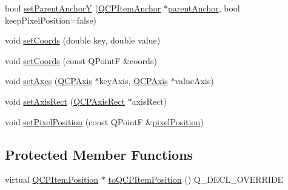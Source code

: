 \begin{DoxyCompactItemize}
\item 
bool \hyperlink{classQCPItemPosition_add5ec1db9d19cec58a3b5c9e0a0c3f9d}{set\+Parent\+AnchorY} (\hyperlink{classQCPItemAnchor}{Q\+C\+P\+Item\+Anchor} $\ast$\hyperlink{classQCPItemPosition_a0a87f9dce1af6cc9b510785991bcf1c6}{parent\+Anchor}, bool keep\+Pixel\+Position=false)
\item 
void \hyperlink{classQCPItemPosition_aa988ba4e87ab684c9021017dcaba945f}{set\+Coords} (double key, double value)
\item 
void \hyperlink{classQCPItemPosition_acc70b3abc143287f806e5f154e5e07b0}{set\+Coords} (const Q\+PointF \&coords)
\item 
void \hyperlink{classQCPItemPosition_a2185f45c75ac8cb9be89daeaaad50e37}{set\+Axes} (\hyperlink{classQCPAxis}{Q\+C\+P\+Axis} $\ast$key\+Axis, \hyperlink{classQCPAxis}{Q\+C\+P\+Axis} $\ast$value\+Axis)
\item 
void \hyperlink{classQCPItemPosition_a0cd9b326fb324710169e92e8ca0041c2}{set\+Axis\+Rect} (\hyperlink{classQCPAxisRect}{Q\+C\+P\+Axis\+Rect} $\ast$axis\+Rect)
\item 
void \hyperlink{classQCPItemPosition_a8d4f858f2089973967cf9cb81970ef0a}{set\+Pixel\+Position} (const Q\+PointF \&\hyperlink{classQCPItemPosition_a8be9a4787635433edecc75164beb748d}{pixel\+Position})
\end{DoxyCompactItemize}
\subsection*{Protected Member Functions}
\begin{DoxyCompactItemize}
\item 
virtual \hyperlink{classQCPItemPosition}{Q\+C\+P\+Item\+Position} $\ast$ \hyperlink{classQCPItemPosition_a008ff9ebe645a963671b68bcf7f7a1c0}{to\+Q\+C\+P\+Item\+Position} () Q\+\_\+\+D\+E\+C\+L\+\_\+\+O\+V\+E\+R\+R\+I\+DE
\end{DoxyCompactItemize}
